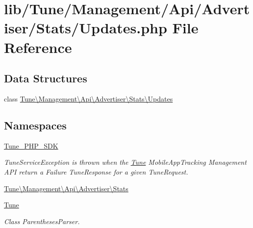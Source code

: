 \hypertarget{Updates_8php}{\section{lib/\-Tune/\-Management/\-Api/\-Advertiser/\-Stats/\-Updates.php File Reference}
\label{Updates_8php}
}
\subsection*{Data Structures}
\begin{DoxyCompactItemize}
\item 
class \hyperlink{classTune_1_1Management_1_1Api_1_1Advertiser_1_1Stats_1_1Updates}{Tune\textbackslash{}\-Management\textbackslash{}\-Api\textbackslash{}\-Advertiser\textbackslash{}\-Stats\textbackslash{}\-Updates}
\end{DoxyCompactItemize}
\subsection*{Namespaces}
\begin{DoxyCompactItemize}
\item 
\hyperlink{namespaceTune__PHP__SDK}{Tune\-\_\-\-P\-H\-P\-\_\-\-S\-D\-K}
\begin{DoxyCompactList}\small\item\em Tune\-Service\-Exception is thrown when the \hyperlink{namespaceTune}{Tune} Mobile\-App\-Tracking Management A\-P\-I return a Failure Tune\-Response for a given Tune\-Request. \end{DoxyCompactList}\item 
\hyperlink{namespaceTune_1_1Management_1_1Api_1_1Advertiser_1_1Stats}{Tune\textbackslash{}\-Management\textbackslash{}\-Api\textbackslash{}\-Advertiser\textbackslash{}\-Stats}
\item 
\hyperlink{namespaceTune}{Tune}
\begin{DoxyCompactList}\small\item\em Class Parentheses\-Parser. \end{DoxyCompactList}\end{DoxyCompactItemize}
